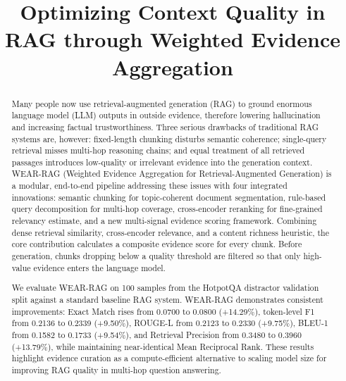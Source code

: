 \documentclass[conference]{IEEEtran}
\begin{document}
\title{Optimizing Context Quality in RAG through Weighted Evidence Aggregation}

\author{
\and
{}
}

\maketitle

\begin{abstract}
Many people now use retrieval-augmented generation (RAG) to ground enormous language model (LLM) outputs in outside evidence, therefore lowering hallucination and increasing factual trustworthiness. Three serious drawbacks of traditional RAG systems are, however: fixed-length chunking disturbs semantic coherence; single-query retrieval misses multi-hop reasoning chains; and equal treatment of all retrieved passages introduces low-quality or irrelevant evidence into the generation context. WEAR-RAG (Weighted Evidence Aggregation for Retrieval-Augmented Generation) is a modular, end-to-end pipeline addressing these issues with four integrated innovations: semantic chunking for topic-coherent document segmentation, rule-based query decomposition for multi-hop coverage, cross-encoder reranking for fine-grained relevancy estimate, and a new multi-signal evidence scoring framework. Combining dense retrieval similarity, cross-encoder relevance, and a content richness heuristic, the core contribution calculates a composite evidence score for every chunk. Before generation, chunks dropping below a quality threshold are filtered so that only high-value evidence enters the language model.

We evaluate WEAR-RAG on 100 samples from the HotpotQA distractor validation split against a standard baseline RAG system. WEAR-RAG demonstrates consistent improvements: Exact Match rises from 0.0700 to 0.0800 (+14.29\%), token-level F1 from 0.2136 to 0.2339 (+9.50\%), ROUGE-L from 0.2123 to 0.2330 (+9.75\%), BLEU-1 from 0.1582 to 0.1733 (+9.54\%), and Retrieval Precision from 0.3480 to 0.3960 (+13.79\%), while maintaining near-identical Mean Reciprocal Rank. These results highlight evidence curation as a compute-efficient alternative to scaling model size for improving RAG quality in multi-hop question answering.
\end{abstract}
\end{document}
